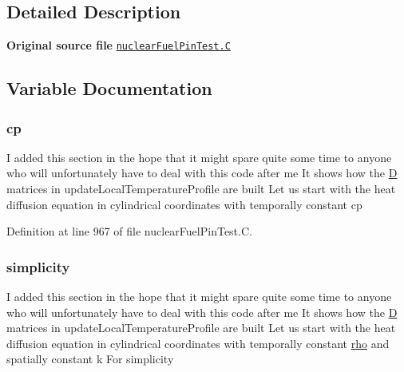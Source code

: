 \subsection{Detailed Description}
{\bfseries Original source file} \href{../../../home/carlo/data/GeN-Foam/GeN-Foam_ffn/GeN-Foam/GeN-Foam/classes/thermalHydraulics/src/phaseModels/structureModels/powerModels/nuclearFuelPinTest/nuclearFuelPinTest.C}{\tt nuclear\+Fuel\+Pin\+Test.\+C} 

\subsection{Variable Documentation}
\mbox{\label{nuclearFuelPinTest_8C_ae5fc70d73cd9d6fbeb7bf5456b34ef16}} 
\subsubsection{\texorpdfstring{cp}{cp}}
{\footnotesize\ttfamily I added this section in the hope that it might spare quite some time to anyone who will unfortunately have to deal with this code after me It shows how the \hyperlink{setXSFieldsSN_8H_a70ac93a527a85b4edf386830643d1561}{D} matrices in update\+Local\+Temperature\+Profile are built Let us start with the heat diffusion equation in cylindrical coordinates with temporally constant cp}



Definition at line 967 of file nuclear\+Fuel\+Pin\+Test.\+C.

\mbox{\label{nuclearFuelPinTest_8C_ab5364626cf5774043302fd6c7196a05f}} 
\subsubsection{\texorpdfstring{simplicity}{simplicity}}
{\footnotesize\ttfamily I added this section in the hope that it might spare quite some time to anyone who will unfortunately have to deal with this code after me It shows how the \hyperlink{setXSFieldsSN_8H_a70ac93a527a85b4edf386830643d1561}{D} matrices in update\+Local\+Temperature\+Profile are built Let us start with the heat diffusion equation in cylindrical coordinates with temporally constant \hyperlink{EEqn__1pl_8H_ac955f87ac2b79f02f420cae087fc52b1}{rho} and spatially constant k For simplicity}



